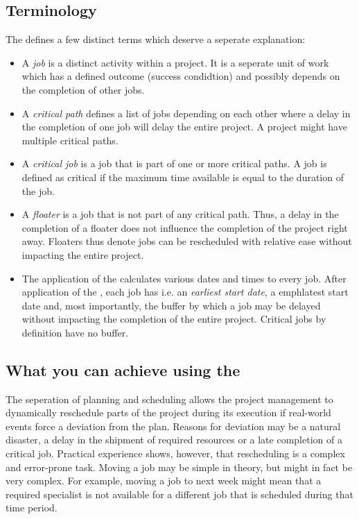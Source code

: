 \subsection{Terminology}
The \cpm{} defines a few distinct terms which deserve a seperate explanation:
\begin{itemize}
  \item A \emph{job} is a distinct activity within a project. It is a seperate unit of work which
  has a defined outcome (success condidtion) and possibly depends on the completion of other jobs.
  \item A \emph{critical path} defines a list of jobs depending on each other where a delay in the
  completion of one job will delay the entire project. A project might have multiple critical paths.
  \item A \emph{critical job} is a job that is part of one or more critical paths. A job is defined
  as critical if the maximum time available is equal to the duration of the job\cite[p.
  163]{Kelley:1959:CPS:1460299.1460318}.
  \item A \emph{floater} is a job that is not part of any critical path. Thus, a delay in the
  completion of a floater does not influence the completion of the project right away. Floaters thus
  denote jobs can be rescheduled with relative ease without impacting the entire project.
  \item The application of the \cpm{} calculates various dates and times to every job. After
  application of the \cpm{}, each job has i.e. an \emph{earliest start date}, a emph{latest start
  date} and, most importantly, the buffer by which a job may be delayed without impacting the
  completion of the entire project. Critical jobs by definition have no buffer.
\end{itemize}

\subsection{What you can achieve using the \cpm}
The seperation of planning and scheduling allows the project management to dynamically reschedule
parts of the project during its execution if real-world events force a deviation from the plan.
Reasons for deviation may be a natural disaster, a delay in the shipment of required resources or
a late completion of a critical job. Practical experience shows, however, that rescheduling is a
complex and error-prone task. Moving a job may be simple in theory, but might in fact be very
complex. For example, moving a job to next week might mean that a required specialist is not
available for a different job that is scheduled during that time period.

